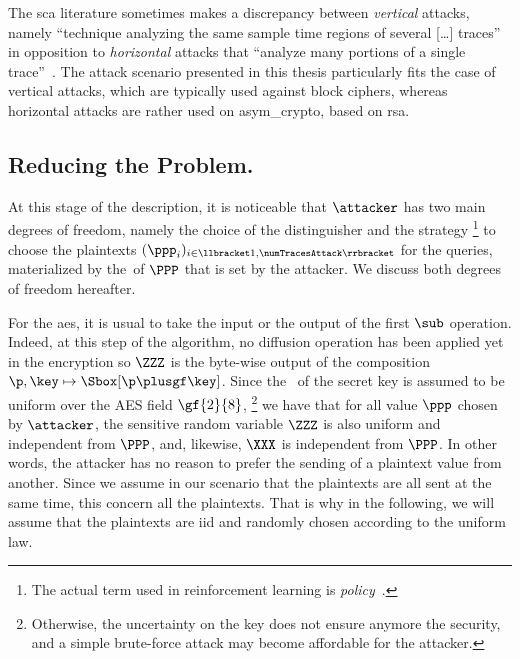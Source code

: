 \begin{remark}
    The \gls{sca} literature sometimes makes a discrepancy between \emph{vertical} attacks, namely ``technique analyzing the same sample time regions of several [\ldots] traces'' in opposition to \emph{horizontal} attacks that ``analyze many portions of a single trace''~\cite{cagli_these_2018}.
    The attack scenario presented in this thesis particularly fits the case of vertical attacks, which are typically used against block ciphers, whereas horizontal attacks are rather used on \gls{asym_crypto}, \eg{} based on \gls{rsa}.
\end{remark}


\subsection{Reducing the Problem.}
\label{sec:reducing_chunk}
At this stage of the description, it is noticeable that \(\attacker\) has two main degrees of freedom, namely the choice of the distinguisher and the strategy%
\footnote{
    The actual term used in reinforcement learning is \emph{policy}~\cite{sutton_reinforcement_1998}.
}
to choose the plaintexts \((\ppp_i)_{i \in \llbracket 1, \numTracesAttack \rrbracket}\) for the queries, materialized by the \pmf{}\,of \(\PPP\) that is set by the attacker.
We discuss both degrees of freedom hereafter.


For the \gls{aes}, it is usual to take the input or the output of the first \(\sub\) operation.
Indeed, at this step of the algorithm, no diffusion operation has been applied yet in the encryption so \(\ZZZ\) is the byte-wise output of the composition \(\p, \key \mapsto \Sbox[\p \plusgf \key]\).
Since the \pmf{}\ of the secret key is assumed to be uniform over the AES field \(\gf{2}{8}\),%
\footnote{
    Otherwise, the uncertainty on the key does not ensure anymore the security, and a simple brute-force attack may become affordable for the attacker.
}
we have that for all value \(\ppp\) chosen by \(\attacker\), the sensitive random variable \(\ZZZ\) is also uniform and independent from \(\PPP\), and, likewise, \(\XXX\) is independent from \(\PPP\).
In other words, the attacker has no reason to prefer the sending of a plaintext value from another.
Since we assume in our scenario that the plaintexts are all sent at the same time, this concern all the plaintexts.
That is why in the following, we will assume that the plaintexts are \gls{iid} and randomly chosen according to the uniform law.\label{sec:random_p}

